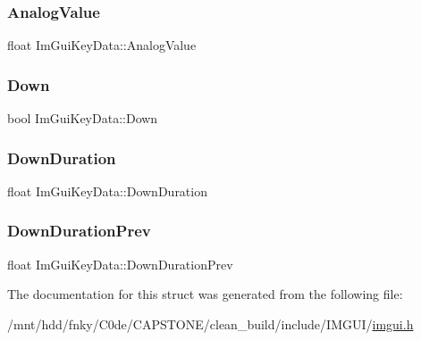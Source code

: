 \subsubsection{\texorpdfstring{Analog\+Value}{AnalogValue}}
{\footnotesize\ttfamily float Im\+Gui\+Key\+Data\+::\+Analog\+Value}

\mbox{\label{structImGuiKeyData_a19d68bb25ef2f7f384564ca155afb028}} 
\subsubsection{\texorpdfstring{Down}{Down}}
{\footnotesize\ttfamily bool Im\+Gui\+Key\+Data\+::\+Down}

\mbox{\label{structImGuiKeyData_a54e78495804cdf28458762bad06dc0ac}} 
\subsubsection{\texorpdfstring{Down\+Duration}{DownDuration}}
{\footnotesize\ttfamily float Im\+Gui\+Key\+Data\+::\+Down\+Duration}

\mbox{\label{structImGuiKeyData_a3adf13e47cc5db980332aff9012975d8}} 
\subsubsection{\texorpdfstring{Down\+Duration\+Prev}{DownDurationPrev}}
{\footnotesize\ttfamily float Im\+Gui\+Key\+Data\+::\+Down\+Duration\+Prev}



The documentation for this struct was generated from the following file\+:\begin{DoxyCompactItemize}
\item 
/mnt/hdd/fnky/\+C0de/\+C\+A\+P\+S\+T\+O\+N\+E/clean\+\_\+build/include/\+I\+M\+G\+U\+I/\hyperlink{imgui_8h}{imgui.\+h}\end{DoxyCompactItemize}
